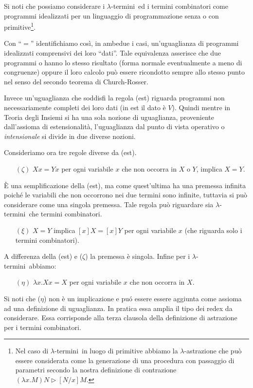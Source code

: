 \documentclass{book}
\newcommand*{\lbts}{$\lambda$-ter\-mi\-ni}
\begin{document}
Si noti che possiamo considerare i \lbts~ed i termini combinatori come
programmi idealizzati per un linguaggio di programmazione senza o con 
primitive\footnote{Nel caso di \lbts~in luogo di primitive abbiamo la 
$\lambda$-astrazione che pu\`o essere considerata come la generazione di una
procedura con passaggio di parametri secondo la nostra definizione di 
contrazione $(\lambda x.M)N \vartriangleright [N/x]M$.}.

Con ``$=$'' identifichiamo cos\`i, in ambedue i casi, un'uguaglianza di
programmi idealizzati comprensivi dei loro ``dati''. Tale equivalenza asserisce
che due programmi o hanno lo stesso risultato (forma normale eventualmente a 
meno di congruenze) oppure il loro calcolo pu\`o essere ricondotto sempre allo
stesso punto nel senso del secondo teorema di Church-Rosser.

Invece un'uguaglianza che soddisfi la regola (est) riguarda programmi non 
necessariamente completi dei loro dati (in est il dato \`e $V$). Quindi mentre
in Teoria degli Insiemi si ha una sola nozione di uguaglianza, proveniente 
dall'assioma di estensionalit\`a, l'uguaglianza dal punto di vista operativo
o \emph{intensionale} si divide in due diverse nozioni.

Consideriamo ora tre regole diverse da (est).

\begin{enumerate}
\item[$(\zeta)$]$Xx = Yx$ per ogni variabile $x$ che non occorra in $X$ o $Y$,
implica $X = Y$.
\end{enumerate}
\`E una semplificazione della (est), ma come quest'ultima ha una premessa 
infinita poich\'e le variabili che non occorrono nei due termini sono infinite,
tuttavia si pu\`o considerare come una singola premessa.
Tale regola pu\`o riguardare sia \lbts~che termini combinatori.
\begin{enumerate}
\item[$(\xi)$]$X = Y$ implica $[x]X = [x]Y$ per ogni variabile $x$ (che 
 riguarda solo i termini combinatori).
\end{enumerate}
A differenza della (est) e ($\zeta$) la premessa \`e singola. Infine per i 
\lbts~abbiamo:
\begin{enumerate}
\item[$(\eta)$]$\lambda x.Xx = X$ per ogni variabile $x$ che non occorra in 
$X$.
\end{enumerate}
Si noti che ($\eta$) non \`e un implicazione e pu\'o essere essere aggiunta 
come assioma ad una definizione di uguaglianza. In pratica essa amplia il tipo
dei redex da considerare. Essa corrisponde alla terza clausola della 
definizione di astrazione per i termini combinatori.
\end{document}
